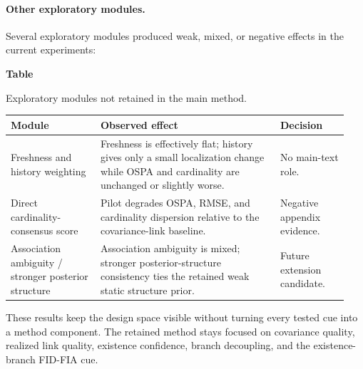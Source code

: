 \paragraph{Other exploratory modules.}
Several exploratory modules produced weak, mixed, or negative effects in the current experiments:

\par\medskip
{}\label{tab:appendix-extra-modules}
\noindent\begin{minipage}{\linewidth}
  \noindent\textbf{Table~\thetable}\par
  \noindent Exploratory modules not retained in the main method.\par\smallskip
  \small
  \centering
  \begin{tabular}{@{}>{\raggedright\arraybackslash}p{0.25\linewidth}>{\raggedright\arraybackslash}p{0.50\linewidth}>{\raggedright\arraybackslash}p{0.19\linewidth}@{}}
    \toprule
    Module & Observed effect & Decision \\
    \midrule
    Freshness and history weighting & Freshness is effectively flat; history gives only a small localization change while OSPA and cardinality are unchanged or slightly worse. & No main-text role. \\
    Direct cardinality-consensus score & Pilot degrades OSPA, RMSE, and cardinality dispersion relative to the covariance-link baseline. & Negative appendix evidence. \\
    Association ambiguity / stronger posterior structure & Association ambiguity is mixed; stronger posterior-structure consistency ties the retained weak static structure prior. & Future extension candidate. \\
    \bottomrule
  \end{tabular}
\end{minipage}
\par\medskip

These results keep the design space visible without turning every tested cue into a method component. The retained method stays focused on covariance quality, realized link quality, existence confidence, branch decoupling, and the existence-branch FID-FIA cue.
